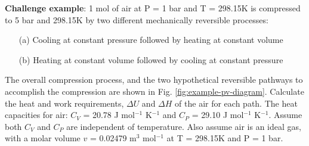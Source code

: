 \documentclass[11pt]{article}
\theoremstyle{definition}
\begin{document}
\begin{mdframed}[backgroundcolor=lgray]
	\noindent\textbf{Challenge example}: 1 mol of air at P = 1 bar and T = 298.15K is compressed to 5 bar and 298.15K by two different mechanically reversible processes:
	\begin{enumerate}
		\item[(a)]{Cooling at constant pressure followed by heating at constant volume}
		\item[(b)]{Heating at constant volume followed by cooling at constant pressure}
	\end{enumerate}
	The overall compression process, and the two hypothetical reversible pathways to accomplish the compression are shown in Fig. \ref{fig:example-pv-diagram}.
	Calculate the heat and work requirements, $\Delta{U}$ and $\Delta{H}$ of the air for each path.
	The heat capacities for air: $C_{V}$ = 20.78 J mol$^{\mathrm{-1}}$ K$^{\mathrm{-1}}$ and $C_{P}$ = 29.10 J mol$^{\mathrm{-1}}$ K$^{\mathrm{-1}}$.
	Assume both $C_{V}$ and $C_{P}$ are independent of temperature.
	Also assume air is an ideal gas, with a molar volume $v$ = 0.02479 m$^{\mathrm{3}}$ mol$^{\mathrm{-1}}$ at T = 298.15K and P = 1 bar.

\end{mdframed}
\clearpage
\end{document}
